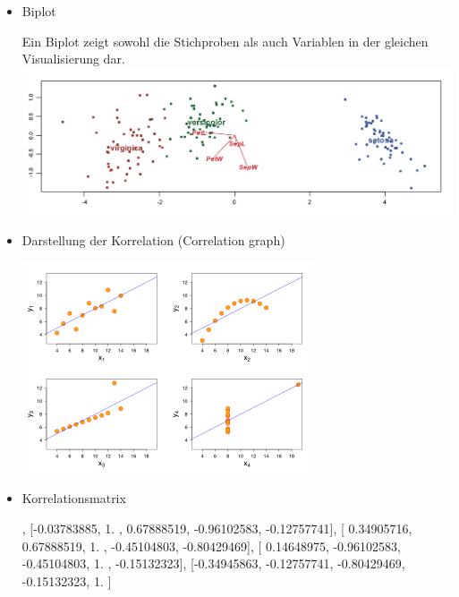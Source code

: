 \documentclass[
  12pt, %
  a4paper, %
  oneside, %
  openany, 
  numbers=noenddot, %
  BCOR=5mm, %
  parskip=half*, %
  thesis, %
]{bfhbook}
\begin{document}
\begin{itemize}
	\item Biplot
	
	\begin{minipage}{\linewidth}
		Ein Biplot zeigt sowohl die Stichproben als auch Variablen in der gleichen Visualisierung dar.
            \includegraphics[width=0.7\linewidth]{Bilder/IrisDAbiplot.jpg}
        \end{minipage}
        
	\item Darstellung der Korrelation (Correlation graph)
	
	\begin{minipage}{\linewidth}
            \includegraphics[width=0.6\linewidth]{Bilder/325px-Anscombe's_quartet_3.png}
        \end{minipage}
        
	\item Korrelationsmatrix
	
	\begin{minipage}[t]{0.45\linewidth}
		\begin{scriptsize}
		[ 1.        , -0.03783885,  0.34905716,  0.14648975, -0.34945863],
      [-0.03783885,  1.        ,  0.67888519, -0.96102583, -0.12757741],
      [ 0.34905716,  0.67888519,  1.        , -0.45104803, -0.80429469],
      [ 0.14648975, -0.96102583, -0.45104803,  1.        , -0.15132323],
      [-0.34945863, -0.12757741, -0.80429469, -0.15132323,  1.        ]
      \end{scriptsize}
	\end{minipage}\hfill
	\begin{minipage}[t]{0.45\linewidth}


\end{minipage}
\end{itemize}
\end{document}
